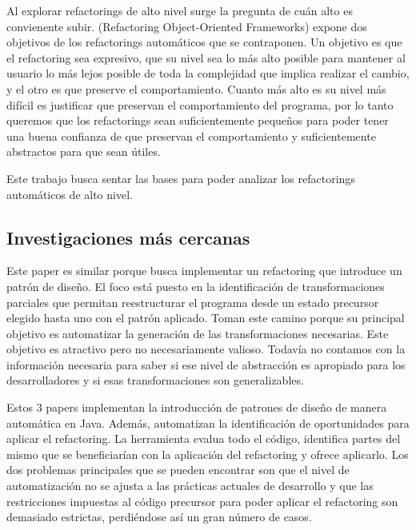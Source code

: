 \begin{description}
Al explorar refactorings de alto nivel surge la pregunta de cuán alto es
convienente subir.
(Refactoring Object-Oriented Frameworks) expone dos objetivos de los
refactorings automáticos que se contraponen. Un objetivo es que el refactoring
sea expresivo, que su nivel sea lo más alto posible para mantener al usuario lo
más lejos posible de toda la complejidad que implica realizar el cambio, y el
otro es que preserve el comportamiento. Cuanto más alto es su nivel más difícil
es justificar que preservan el comportamiento del programa, por lo tanto
queremos que los refactorings sean suficientemente pequeños para poder tener una
buena confianza de que preservan el comportamiento y suficientemente abstractos
para que sean útiles.

Este trabajo busca sentar las bases para poder analizar los refactorings
automáticos de alto nivel.



\subsection{Investigaciones más cercanas}
Este paper es similar porque busca implementar un refactoring que introduce un
patrón de diseño. El foco está puesto en la identificación de transformaciones
parciales que permitan reestructurar el programa desde un estado precursor
elegido hasta uno con el patrón aplicado. Toman este camino porque su principal
objetivo es automatizar la generación de las transformaciones necesarias. Este
objetivo es atractivo pero no necesariamente valioso. Todavía no contamos con la
información necesaria para saber si ese nivel de abstracción es apropiado para
los desarrolladores y si esas transformaciones son generalizables.

Estos 3 papers implementan la introducción de patrones de diseño de manera
automática en Java. Además, automatizan la identificación de oportunidades para
aplicar el refactoring. La herramienta evalua todo el código, identifica partes
del mismo que se beneficiarían con la aplicación del refactoring y ofrece
aplicarlo. Los dos problemas principales
que se pueden encontrar son que el nivel de automatización no se ajusta a las
prácticas actuales de desarrollo y que las restricciones impuestas al código
precursor para poder aplicar el refactoring son demasiado estrictas, perdiéndose
así un gran número de casos.


\end{description}
